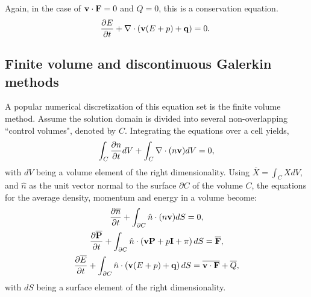 Again, in the case of $\mathbf{v}\cdot\mathbf{F} = 0$ and $Q=0$, this is a conservation equation. 
\begin{gather}
    \frac{\partial E}{\partial t} + \nabla \cdot\left(\mathbf{v} (E + p)+\mathbf{q}\right) =  0.~\label{eq:energy_conservation}
\end{gather}

\subsection{Finite volume and discontinuous Galerkin methods}

A popular numerical discretization of this equation set is the finite volume method. Assume the solution domain is divided into several non-overlapping ``control volumes", denoted by $C$. Integrating the equations over a cell yields,
\begin{gather}
	\int_C\frac{\partial n}{\partial t}dV + \int_C \nabla \cdot (n \mathbf{v})dV = 0,
\end{gather}
with $dV$ being a volume element of the right dimensionality. Using $\overline X = \int_C X dV$, and $\hat n$ as the unit vector normal to the surface $\partial C$ of the volume $C$, the equations for the average density, momentum and energy in a volume become:
\begin{gather}
	\frac{\partial \overline n}{\partial t} + \int_{\partial C} \hat n \cdot (n \mathbf{v})dS = 0,\\
    	\frac{\partial \overline {\mathbf{P}}}{\partial t} + \int_{\partial C} \hat n  \cdot\left(\mathbf{v} \mathbf{P} + p \mathbf{I} + \pi\right)dS = \overline {\mathbf{F}},\\
    	\frac{\partial \overline E}{\partial t} +  \int_{\partial C} \hat n \cdot \left(\mathbf{v} (E + p)+\mathbf{q}\right)dS =  \overline{\mathbf{v}\cdot\mathbf{F}}+ \overline Q,
\end{gather}
with $dS$ being a surface element of the right dimensionality.

























